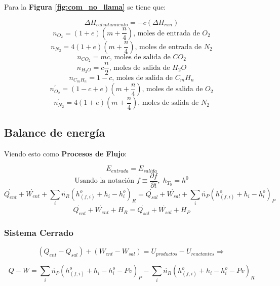     Para la \textbf{Figura \ref{fig:com_no_llama}} se tiene que:
    
    \[\Delta H_{calentamiento}=-c(\Delta H_{rxn})\]
    \[n_{O_{2}}=(1+e)\left ( m + \frac{n}{4} \right )\text{, moles de entrada de }O_{2}\]
    \[n_{N_{2}}=4(1+e)\left ( m + \frac{n}{4} \right )\text{, moles de entrada de }N_{2}\]
    \[n_{CO_{2}}=mc\text{, moles de salida de }CO_{2}\]
    \[n_{H_{2}O}=c \frac{n}{2}\text{, moles de salida de }H_{2}O\]
    \[n_{C_{m}H_{n}}=1-c\text{, moles de salida de }C_{m}H_{n}\]
    \[n_{O_{2}}^{'}=(1-c+e)\left ( m + \frac{n}{4} \right )\text{, moles de salida de }O_{2}\]
    \[n_{N_{2}}^{'}=4(1+e)\left ( m + \frac{n}{4} \right )\text{, moles de salida de }N_{2}\]
    
    \subsection{Balance de energía}
    
    Viendo esto como \textbf{Procesos de Flujo}:
    
    \begin{quote}
        \textit{}
    \end{quote}
    
    \[E_{entrada}=E_{salida}\]
    \[\text{Usando la notación } \dot{f}\equiv \frac{\partial f}{\partial t},\;h_{T_{0}}=h^{0}\]
    \[\dot{Q_{ent}}+\dot{W_{ent}}+\sum_{i} \dot{n_{R}}(h_{(f,i)}^{o}+h_{i}-h_{i}^{o})_{R}=\dot{Q_{sal}}+\dot{W_{sal}}+\sum_{i} \dot{n_{P}}(h_{(f,i)}^{o}+h_{i}-h_{i}^{o})_{P}\]
    \begin{equation}
    \label{balance_proc_flujo}
        \dot{Q_{ent}}+\dot{W_{ent}}+H_{R}=\dot{Q_{sal}}+\dot{W_{sal}}+H_{P}
    \end{equation}
    
        \subsubsection{Sistema Cerrado}
        
        \[(Q_{ent}-Q_{sal})+(W_{ent}-W_{sal})=U_{productos}-U_{reactantes} \Rightarrow\]
        
        \begin{equation}
        \label{sis_cerrado_termoquimica}
            Q-W=\sum_{i} \dot{n_{P}}(h_{(f,i)}^{o}+h_{i}-h_{i}^{o}-Pv)_{P} - \sum_{i} \dot{n_{R}}(h_{(f,i)}^{o}+h_{i}-h_{i}^{o}-Pv)_{R}
        \end{equation}
        
